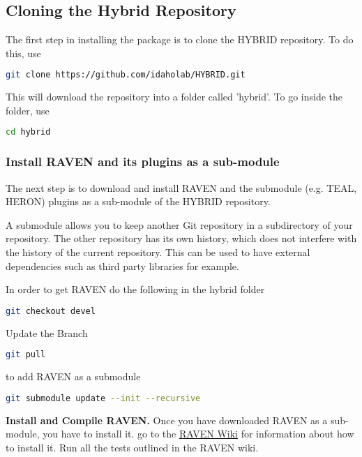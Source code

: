 \subsection{Cloning the Hybrid Repository}
\label{sec:clone raven}

The first step in installing the package is to clone the HYBRID repository. To do this, use
\begin{lstlisting}[language=bash]
git clone https://github.com/idaholab/HYBRID.git
\end{lstlisting}
This will download the repository into a folder called 'hybrid'. To go inside the folder, use
\begin{lstlisting}[language=bash]
cd hybrid
\end{lstlisting}


\subsubsection{Install RAVEN and its plugins as a sub-module}

The next step is to download and install RAVEN and the submodule (e.g. TEAL, HERON) plugins as a sub-module of the HYBRID repository. 

A submodule allows you to keep another Git repository in a subdirectory of your repository. The other repository has its own history, which does not interfere with the history of the current repository. This can be used to have external dependencies such as third party libraries for example.

In order to get RAVEN do the following in the hybrid folder

\begin{lstlisting}[language=bash]
git checkout devel
\end{lstlisting}

Update the Branch

\begin{lstlisting}[language=bash]
git pull
\end{lstlisting}

to add RAVEN as a submodule
\begin{lstlisting}[language=bash]
git submodule update --init --recursive
\end{lstlisting}

\textbf{Install and Compile RAVEN. }
Once you have downloaded RAVEN as a sub-module, you have to install it. go to the \href{https://github.com/idaholab/raven/wiki/intallationMain}{RAVEN Wiki} for information about how to install it. Run all the tests outlined in the RAVEN wiki. 

